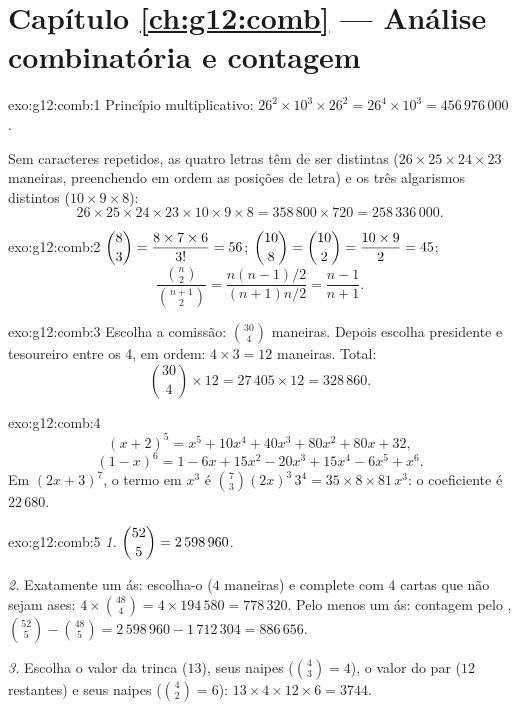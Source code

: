 \section*{Capítulo \ref{ch:g12:comb} --- Análise combinatória e contagem}

\begin{solution}{exo:g12:comb:1}
Princípio multiplicativo:
$26^2 \times 10^3 \times 26^2 = 26^4 \times 10^3 = 456\,976\,000$.

Sem caracteres repetidos, as quatro letras têm de ser distintas
($26 \times 25 \times 24 \times 23$ maneiras, preenchendo em ordem as
posições de letra) e os três algarismos distintos
($10 \times 9 \times 8$):
\[
26 \times 25 \times 24 \times 23 \times 10 \times 9 \times 8
= 358\,800 \times 720 = 258\,336\,000 .
\]
\end{solution}

\begin{solution}{exo:g12:comb:2}
$\dbinom83 = \dfrac{8 \times 7 \times 6}{3!} = 56$;
$\dbinom{10}{8} = \dbinom{10}{2} = \dfrac{10 \times 9}{2} = 45$;
\[
\frac{\binom n2}{\binom{n+1}2}
= \frac{n(n-1)/2}{(n+1)n/2} = \frac{n-1}{n+1}.
\]
\end{solution}

\begin{solution}{exo:g12:comb:3}
Escolha a comissão: $\binom{30}{4}$ maneiras. Depois escolha presidente e
tesoureiro entre os 4, em ordem: $4 \times 3 = 12$ maneiras. Total:
\[
\binom{30}{4} \times 12 = 27\,405 \times 12 = 328\,860 .
\]
\end{solution}

\begin{solution}{exo:g12:comb:4}
\[
(x+2)^5 = x^5 + 10x^4 + 40x^3 + 80x^2 + 80x + 32 ,
\]
\[
(1-x)^6 = 1 - 6x + 15x^2 - 20x^3 + 15x^4 - 6x^5 + x^6 .
\]
Em $(2x+3)^7$, o termo em $x^3$ é
$\binom{7}{3}(2x)^3\,3^4 = 35 \times 8 \times 81\, x^3$: o coeficiente é
$22\,680$.
\end{solution}

\begin{solution}{exo:g12:comb:5}
\emph{1.} $\dbinom{52}{5} = 2\,598\,960$.

\emph{2.} Exatamente um ás: escolha-o ($4$ maneiras) e complete com $4$
cartas que não sejam ases:
$4 \times \binom{48}{4} = 4 \times 194\,580 = 778\,320$. Pelo menos um ás:
contagem pelo ,
$\binom{52}{5} - \binom{48}{5} = 2\,598\,960 - 1\,712\,304 = 886\,656$.

\emph{3.} Escolha o valor da trinca ($13$), seus naipes
($\binom43 = 4$), o valor do par ($12$ restantes) e seus naipes
($\binom42 = 6$): $13 \times 4 \times 12 \times 6 = 3744$.
\end{solution}

